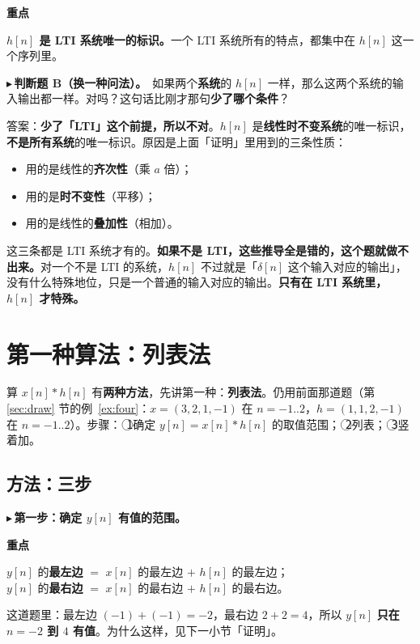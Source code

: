 \documentclass[UTF8,a4paper,11pt]{ctexart}
\newenvironment{remember}{\begin{rememberbox}\textbf{重点}\par\smallskip}{\end{rememberbox}}
\newcounter{ex}[section]
\newcommand{\point}[1]{\par\addvspace{1ex}\noindent\textcolor{ptteal}{$\blacktriangleright$\,\textbf{#1}}\ }
\begin{document}
\begin{remember}
\textbf{$h[n]$ 是 LTI 系统唯一的标识。}一个 LTI 系统所有的特点，都集中在 $h[n]$ 这一个序列里。
\end{remember}

\point{判断题 B（换一种问法）。}如果两个\textbf{系统}的 $h[n]$ 一样，那么这两个系统的输入输出都一样。对吗？这句话比刚才那句\textbf{少了哪个条件}？

答案：\textbf{少了「LTI」这个前提，所以不对}。$h[n]$ 是\textbf{线性时不变系统}的唯一标识，\textbf{不是所有系统}的唯一标识。原因是上面「证明」里用到的三条性质：

\begin{itemize}[nosep]
\item 用的是线性的\textbf{齐次性}（乘 $a$ 倍）；
\item 用的是\textbf{时不变性}（平移）；
\item 用的是线性的\textbf{叠加性}（相加）。
\end{itemize}
这三条都是 LTI 系统才有的。\textbf{如果不是 LTI，这些推导全是错的，这个题就做不出来。}对一个不是 LTI 的系统，$h[n]$ 不过就是「$\delta[n]$ 这个输入对应的输出」，没有什么特殊地位，只是一个普通的输入对应的输出。\textbf{只有在 LTI 系统里，$h[n]$ 才特殊。}


\section{第一种算法：列表法}\label{sec:list}
算 $x[n]\ast h[n]$ 有\textbf{两种方法}，先讲第一种：\textbf{列表法}。仍用前面那道题（第 \ref{sec:draw} 节的例~\ref{ex:four}：$x=(3,2,1,-1)$ 在 $n=-1..2$，$h=(1,1,2,-1)$ 在 $n=-1..2$）。步骤：\ \textcircled{1}确定 $y[n]=x[n]\ast h[n]$ 的取值范围；\ \textcircled{2}列表；\ \textcircled{3}竖着加。

\subsection{方法：三步}
\point{第一步：确定 $y[n]$ 有值的范围。}
\begin{remember}
$y[n]$ 的\textbf{最左边} $=$ $x[n]$ 的最左边 $+$ $h[n]$ 的最左边；\\
$y[n]$ 的\textbf{最右边} $=$ $x[n]$ 的最右边 $+$ $h[n]$ 的最右边。
\end{remember}
这道题里：最左边 $(-1)+(-1)=-2$，最右边 $2+2=4$，所以 $y[n]$ \textbf{只在 $n=-2$ 到 $4$ 有值}。为什么这样，见下一小节「证明」。
\end{document}
